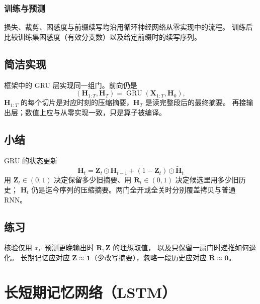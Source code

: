 \subsubsection{训练与预测}

损失、裁剪、困惑度与前缀续写均沿用循环神经网络从零实现中的流程。
训练后比较训练集困惑度（有效分支数）以及给定前缀时的续写序列。

\subsection{简洁实现}

框架中的 GRU 层实现同一组门。前向仍是
\[
(\bm{H}_{1:T},\bm{H}_T)=\operatorname{GRU}(\bm{X}_{1:T},\bm{H}_0),
\]
$\bm{H}_{1:T}$ 的每个切片是对应时刻的压缩摘要，$\bm{H}_T$ 是读完整段后的最终摘要。
再接输出层；数值上应与从零实现一致，只是算子被编译。

\subsection{小结}

GRU 的状态更新
\[
\bm{H}_t=\bm{Z}_t\odot\bm{H}_{t-1}+(1-\bm{Z}_t)\odot\tilde{\bm{H}}_t
\]
用 $\bm{Z}_t\in(0,1)$ 决定保留多少旧摘要、用 $\bm{R}_t\in(0,1)$ 决定候选里用多少旧历史；
$\bm{H}_t$ 仍是迄今序列的压缩摘要。两门全开或全关时分别覆盖拷贝与普通 RNN。

\subsection{练习}

核验仅用 $x_{t'}$ 预测更晚输出时 $\bm{R},\bm{Z}$ 的理想取值，
以及只保留一扇门时递推如何退化。
长期记忆应对应 $\bm{Z}\approx\bm{1}$（少改写摘要），忽略一段历史应对应 $\bm{R}\approx\bm{0}$。

\section{长短期记忆网络（LSTM）}




